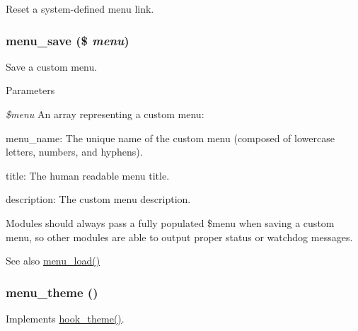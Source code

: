 \label{menu_8module_a4f49ddc59d8da61e8b1b9679922f2e11}
Reset a system-\/defined menu link. \hypertarget{menu_8module_a005ec36cc6d575b6ace69a5b50fccfc4}{
\subsubsection[{menu\_\-save}]{\setlength{\rightskip}{0pt plus 5cm}menu\_\-save (\$ {\em menu})}}
\label{menu_8module_a005ec36cc6d575b6ace69a5b50fccfc4}
Save a custom menu.


\begin{DoxyParams}{Parameters}
\item[{\em \$menu}]An array representing a custom menu:
\begin{DoxyItemize}
\item menu\_\-name: The unique name of the custom menu (composed of lowercase letters, numbers, and hyphens).
\item title: The human readable menu title.
\item description: The custom menu description.
\end{DoxyItemize}\end{DoxyParams}
Modules should always pass a fully populated \$menu when saving a custom menu, so other modules are able to output proper status or watchdog messages.

\begin{DoxySeeAlso}{See also}
\hyperlink{menu_8module_afa91fb0278c163a85e7a0913d7fedb3b}{menu\_\-load()} 
\end{DoxySeeAlso}
\hypertarget{menu_8module_a726e874946f3c2090e19aee6119be702}{
\subsubsection[{menu\_\-theme}]{\setlength{\rightskip}{0pt plus 5cm}menu\_\-theme ()}}
\label{menu_8module_a726e874946f3c2090e19aee6119be702}
Implements \hyperlink{group__hooks_ga013ccb45c7aaab1c16cf9691428c910d}{hook\_\-theme()}. 